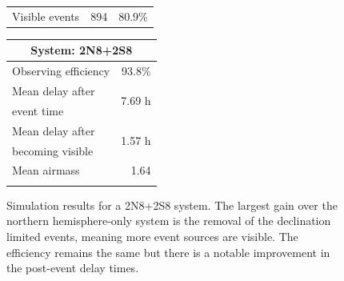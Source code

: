 \begin{colsection}
\begin{colsection}
\begin{figure}[p]
\begin{center}
\begin{minipage}[t]{0.37\textwidth}
\begin{tabular}{lrr}
                \midrule
                Visible events & 894 &  80.9\% \\
            \end{tabular}
        \end{minipage}
        \begin{minipage}[t]{0.35\textwidth}\vspace{0pt}
            \begin{tabular}{lr}
                \multicolumn{2}{c}{\textbf{System: 2N8+2S8}} \\
                \midrule
                Observing efficiency & 93.8\% \\
                \midrule
                Mean delay after     & \multirow{2}{*}{7.69 h} \\
                event time           & \\
                Mean delay after     & \multirow{2}{*}{1.57 h} \\
                becoming visible     & \\
                \midrule
                Mean airmass         & 1.64 \\
                & \\
            \end{tabular}
        \end{minipage}
    \end{center}
    \caption[GW simulation results: 2N8+2S8 system]{
        Simulation results for a 2N8+2S8 system. The largest gain over the northern hemisphere-only system is the removal of the declination limited events, meaning more event sources are visible. The efficiency remains the same but there is a notable improvement in the post-event delay times.
    }\label{fig:gw_sim_2n8+2s8}
\end{figure}


\end{colsection}
\end{colsection}
